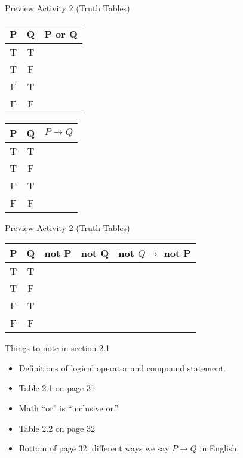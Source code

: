 \documentclass{beamer}
\begin{document}
\begin{frame}{Preview Activity 2 (Truth Tables)}
	\begin{center} 
		\begin{tabular}{|c|c|c|}
			\hline
			P & Q & P or Q\\ \hline
			T & T & \\ \hline
			T & F & \\ \hline
			F & T & \\ \hline
			F & F & \\ \hline
		\end{tabular}
		
		\vspace{.5 in}
		
		\begin{tabular}{|c|c|c|}
			\hline
			P & Q & $P \to Q$\\ \hline
			T & T & \\ \hline
			T & F & \\ \hline
			F & T & \\ \hline
			F & F & \\ \hline
		\end{tabular}
	\end{center}
\end{frame}

\begin{frame}{Preview Activity 2 (Truth Tables)}
	\begin{center} 
		\begin{tabular}{|c|c|c|c|c|}
			\hline
			P & Q & not P & not Q & not $Q \to $ not P\\ \hline
			T & T &&& \\ \hline
			T & F &&& \\ \hline
			F & T &&& \\ \hline
			F & F &&& \\ \hline
		\end{tabular}
	\end{center}
\end{frame}

\begin{frame}{Things to note in section 2.1}
	\begin{itemize}
		\item Definitions of logical operator and compound statement.\\[.1 in] \pause
		\item Table 2.1 on page 31\\[.1 in] \pause
		\item Math ``or'' is ``inclusive or.''\\[.1 in] \pause
		\item Table 2.2 on page 32\\[.1 in] \pause
		\item Bottom of page 32: different ways we say $P \to Q$ in English.
	\end{itemize}
\end{frame}
\end{document}
